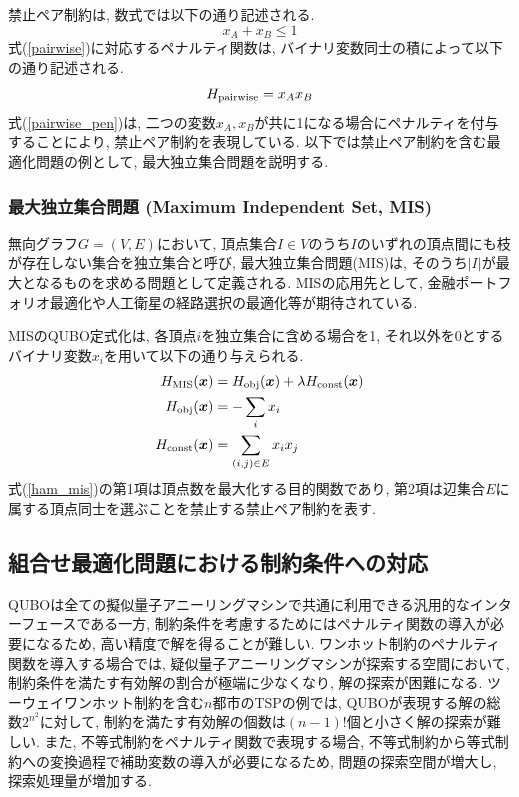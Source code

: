 \documentclass[submit,techrep,noauthor]{ipsj}
\begin{document}
禁止ペア制約は, 数式では以下の通り記述される.
\begin{equation}
x_{A}+x_{B} \le 1 \label{pairwise}
\end{equation}
式(\ref{pairwise})に対応するペナルティ関数は, バイナリ変数同士の積によって以下の通り記述される.
\begin{equation}
H_{{\rm pairwise}}=x_{A}x_{B} \label{pairwise_pen}
\end{equation}
式(\ref{pairwise_pen})は, 二つの変数$x_{A}, x_{B}$が共に1になる場合にペナルティを付与することにより, 禁止ペア制約を表現している. 以下では禁止ペア制約を含む最適化問題の例として, 最大独立集合問題を説明する.

\subsubsection{最大独立集合問題 (Maximum Independent Set, MIS)}
無向グラフ$G=(V, E)$において, 頂点集合$I\in V$のうち$I$のいずれの頂点間にも枝が存在しない集合を独立集合と呼び, 最大独立集合問題(MIS)は, そのうち$|I|$が最大となるものを求める問題として定義される. MISの応用先として, 金融ポートフォリオ最適化や人工衛星の経路選択の最適化等が期待されている.

MISのQUBO定式化は, 各頂点$i$を独立集合に含める場合を1, それ以外を0とするバイナリ変数$x_{i}$を用いて以下の通り与えられる.
\begin{align}
H_{\rm{MIS}}(\bm{x}) &= H_{\rm{obj}}(\bm{x}) + \lambda H_{\rm{const}}(\bm{x})\nonumber\\
H_{\rm{obj}}(\bm{x}) &= -\sum_{i}x_{i}\nonumber\\
H_{\rm{const}}(\bm{x}) &= \sum_{(i,j)\in E }x_{i}x_{j}
\label{ham_mis}
\end{align}
式(\ref{ham_mis})の第1項は頂点数を最大化する目的関数であり, 第2項は辺集合$E$に属する頂点同士を選ぶことを禁止する禁止ペア制約を表す.

\subsection{組合せ最適化問題における制約条件への対応}
QUBOは全ての擬似量子アニーリングマシンで共通に利用できる汎用的なインターフェースである一方, 制約条件を考慮するためにはペナルティ関数の導入が必要になるため, 高い精度で解を得ることが難しい. ワンホット制約のペナルティ関数を導入する場合では, 疑似量子アニーリングマシンが探索する空間において, 制約条件を満たす有効解の割合が極端に少なくなり, 解の探索が困難になる. ツーウェイワンホット制約を含む$n$都市のTSPの例では, QUBOが表現する解の総数$2^{n^{2}}$に対して, 制約を満たす有効解の個数は$(n-1)!$個と小さく解の探索が難しい. また, 不等式制約をペナルティ関数で表現する場合, 不等式制約から等式制約への変換過程で補助変数の導入が必要になるため, 問題の探索空間が増大し, 探索処理量が増加する.
\end{document}
